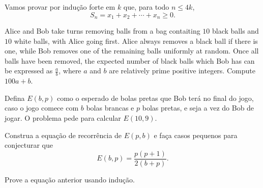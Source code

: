 \documentclass[10pt,a4paper]{article}
\begin{document}

	\begin{sk}
		Vamos provar por indução forte em $k$ que, para todo $n \le 4k$, \[S_n = x_1 + x_2 + \cdots + x_n \ge 0.\]
	\end{sk}

	\begin{prob}
		Alice and Bob take turns removing balls from a bag contaiting $10$ black balls and $10$ white balls, with Alice going first. Alice always removes a black ball if there is one, while Bob removes one of the remaining balls uniformly at random. Once all balls have been removed, the expected number of black balls which Bob has can be expressed as $\frac{a}{b}$, where $a$ and $b$ are relatively prime positive integers. Compute $100a + b$.
	\end{prob}

	\begin{sk}
		Defina $E(b, p)$ como o esperado de bolas pretas que Bob terá no final do jogo, caso o jogo comece com $b$ bolas brancas e $p$ bolas pretas, e seja a vez do Bob de jogar. O problema pede para calcular $E(10, 9)$.

		Construa a equação de recorrência de $E(p, b)$ e faça casos pequenos para conjecturar que \[E(b, p) = \frac{p(p+1)}{2(b+p)}.\]

		Prove a equação anterior usando indução.
	\end{sk}
\end{document}
